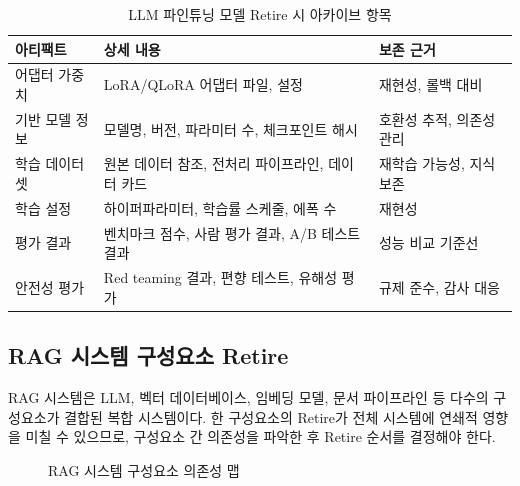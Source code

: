 \begin{table}[htbp]
\centering
\caption{LLM 파인튜닝 모델 Retire 시 아카이브 항목}
\label{tab:llm_finetune_archive}
\begin{tabularx}{\textwidth}{p{3cm}p{3.5cm}X}
\toprule
\textbf{아티팩트} & \textbf{상세 내용} & \textbf{보존 근거} \\
\midrule
어댑터 가중치 &
LoRA/QLoRA 어댑터 파일, 설정 &
재현성, 롤백 대비 \\
\midrule
기반 모델 정보 &
모델명, 버전, 파라미터 수, 체크포인트 해시 &
호환성 추적, 의존성 관리 \\
\midrule
학습 데이터셋 &
원본 데이터 참조, 전처리 파이프라인, 데이터 카드 &
재학습 가능성, 지식 보존 \\
\midrule
학습 설정 &
하이퍼파라미터, 학습률 스케줄, 에폭 수 &
재현성 \\
\midrule
평가 결과 &
벤치마크 점수, 사람 평가 결과, A/B 테스트 결과 &
성능 비교 기준선 \\
\midrule
안전성 평가 &
Red teaming 결과, 편향 테스트, 유해성 평가 &
규제 준수, 감사 대응 \\
\bottomrule
\end{tabularx}
\end{table}

\subsection{RAG 시스템 구성요소 Retire}
\label{sec:12.3b.2}

RAG 시스템은 LLM, 벡터 데이터베이스, 임베딩 모델, 문서 파이프라인 등 다수의 구성요소가 결합된 복합 시스템이다. 한 구성요소의 Retire가 전체 시스템에 연쇄적 영향을 미칠 수 있으므로, 구성요소 간 의존성을 파악한 후 Retire 순서를 결정해야 한다.

\begin{figure}[htbp]
\centering
{}
\caption{RAG 시스템 구성요소 의존성 맵}
\label{fig:rag_dependency}
\end{figure}

